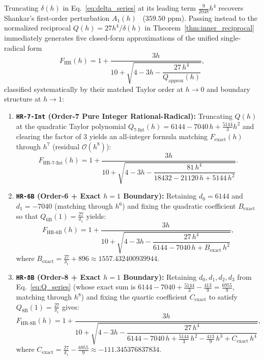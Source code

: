 \documentclass[11pt,a4paper]{article}
\theoremstyle{spacious}
\theoremstyle{spaciousdef}
\begin{document}
Truncating $\delta(h)$ in Eq.~\eqref{eq:delta_series} at its leading term $\tfrac{9}{2048}h^4$ recovers Shankar's first-order perturbation $A_1(h)$~\cite{Shankar2026} ($359.50\text{ ppm}$). Passing instead to the normalized reciprocal $Q(h) = 27h^4/\delta(h)$ in Theorem~\ref{thm:inner_reciprocal} immediately generates five closed-form approximations of the unified single-radical form
\begin{equation}\label{eq:hr_template}
F_{\text{HR}}(h) = 1 + \frac{3h}{10 + \sqrt{4 - 3h - \dfrac{27\,h^4}{Q_{\text{approx}}(h)}}},
\end{equation}
classified systematically by their matched Taylor order at $h \to 0$ and boundary structure at $h \to 1$:

\begin{enumerate}
    \item \textbf{\texttt{HR-7-Int} (Order-7 Pure Integer Rational-Radical):}
    Truncating $Q(h)$ at the quadratic Taylor polynomial $Q_{\text{7-Int}}(h) = 6144 - 7040\,h + \tfrac{5144}{3}h^2$ and clearing the factor of $3$ yields an all-integer formula matching $F_{\text{exact}}(h)$ through $h^7$ (residual $\mathcal{O}(h^8)$):
    \begin{equation}\label{eq:hr7_int}
    F_{\text{HR-7-Int}}(h) = 1 + \frac{3h}{10 + \sqrt{4 - 3h - \dfrac{81\,h^4}{18432 - 21120\,h + 5144\,h^2}}}.
    \end{equation}

    \item \textbf{\texttt{HR-6B} (Order-6 + Exact $h=1$ Boundary):}
    Retaining $d_0 = 6144$ and $d_1 = -7040$ (matching through $h^6$) and fixing the quadratic coefficient $B_{\text{exact}}$ so that $Q_{\text{6B}}(1) = \tfrac{27}{\delta_1}$ yields:
    \begin{equation}\label{eq:hr6b}
    F_{\text{HR-6B}}(h) = 1 + \frac{3h}{10 + \sqrt{4 - 3h - \dfrac{27\,h^4}{6144 - 7040\,h + B_{\text{exact}}\,h^2}}},
    \end{equation}
    where $B_{\text{exact}} = \frac{27}{\delta_1} + 896 \approx 1557.432400939944$.

    \item \textbf{\texttt{HR-8B} (Order-8 + Exact $h=1$ Boundary):}
    Retaining $d_0, d_1, d_2, d_3$ from Eq.~\eqref{eq:Q_series} (whose exact sum is $6144 - 7040 + \tfrac{5144}{3} - \tfrac{413}{9} = \tfrac{6955}{9}$, matching through $h^8$) and fixing the quartic coefficient $C_{\text{exact}}$ to satisfy $Q_{\text{8B}}(1) = \tfrac{27}{\delta_1}$ gives:
    \begin{equation}\label{eq:hr8b}
    F_{\text{HR-8B}}(h) = 1 + \frac{3h}{10 + \sqrt{4 - 3h - \dfrac{27\,h^4}{6144 - 7040\,h + \frac{5144}{3}\,h^2 - \frac{413}{9}\,h^3 + C_{\text{exact}}\,h^4}}},
    \end{equation}
    where $C_{\text{exact}} = \frac{27}{\delta_1} - \frac{6955}{9} \approx -111.345376837834$.


\end{enumerate}
\end{document}
